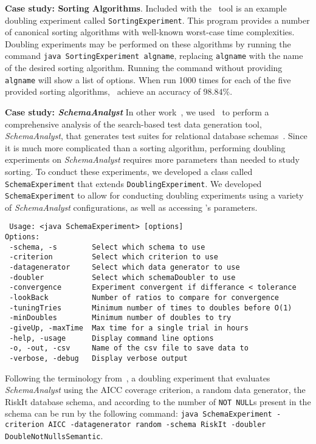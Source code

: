     \lstset{language=bash}

    {\bf Case study: Sorting Algorithms}.  Included with the
    \toolname~tool is an example doubling experiment called
    \texttt{SortingExperiment}.  This program provides a number of
    canonical sorting algorithms with well-known worst-case time
    complexities.  Doubling experiments may be performed on these
    algorithms by running the command \texttt{java SortingExperiment
    algname}, replacing \texttt{algname} with the name of the desired
    sorting algorithm. Running the command without providing
    \texttt{algname} will show a list of options. When run 1000 times
    for each of the five provided sorting algorithms, \toolname~achieve
    an accuracy of $98.84\%$.

    {\bf Case study: \textit{SchemaAnalyst}} In other
    work~\cite{kinneer2015}, we used \toolname~to perform a
    comprehensive analysis of the search-based test data generation
    tool, \textit{SchemaAnalyst}, that generates test suites for
    relational database schemas~\cite{kapfhammer2013}. Since it is much
    more complicated than a sorting algorithm, performing doubling
    experiments on \textit{SchemaAnalyst} requires more parameters than
    needed to study sorting.  To conduct these experiments, we developed
    a class called \texttt{SchemaExperiment} that extends
    \texttt{DoublingExperiment}.  We developed \texttt{SchemaExperiment}
    to allow for conducting doubling experiments using a variety of
    \textit{SchemaAnalyst} configurations, as well as accessing
    \toolname's parameters.

    \vspace*{-.075in}

{\scriptsize
\begin{verbatim}
 Usage: <java SchemaExperiment> [options]
Options:
 -schema, -s        Select which schema to use
 -criterion         Select which criterion to use
 -datagenerator     Select which data generator to use
 -doubler           Select which schemaDoubler to use
 -convergence       Experiment convergent if differance < tolerance
 -lookBack          Number of ratios to compare for convergence
 -tuningTries       Minimum number of times to doubles before O(1)
 -minDoubles        Minimum number of doubles to try
 -giveUp, -maxTime  Max time for a single trial in hours
 -help, -usage      Display command line options
 -o, -out, -csv     Name of the csv file to save data to
 -verbose, -debug   Display verbose output
\end{verbatim}
}

    \vspace*{-.075in}

Following the terminology from~\cite{kempka2015}, a doubling experiment
that evaluates \textit{SchemaAnalyst} using the AICC coverage criterion,
a random data generator, the RiskIt database schema, and according to
the number of \texttt{NOT NULL}s present in the schema can be run by the
following command: \texttt{java SchemaExperiment -criterion AICC
-datagenerator random -schema RiskIt -doubler DoubleNotNullsSemantic}.


